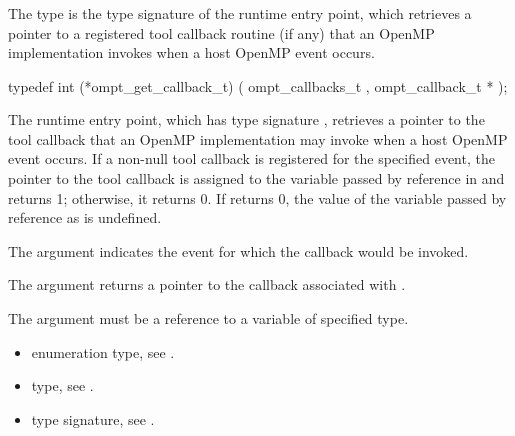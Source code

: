 \subsubsection{}
\label{sec:ompt_get_callback_t}
\label{sec:ompt_get_callback}

\summary
The  type is the type signature of the 
 runtime entry point, which retrieves a
pointer to a registered tool callback routine (if any) that an 
OpenMP implementation invokes when a host OpenMP event occurs.

\format
\begin{ccppspecific}
\begin{omptCallback}
typedef int (*ompt_get_callback_t) (
  ompt_callbacks_t ,
  ompt_callback_t *
);
\end{omptCallback}
\end{ccppspecific}

\descr
The  runtime entry point, which has type signature 
, retrieves a pointer to the tool callback that
an OpenMP implementation may invoke when a host OpenMP event occurs. If a 
non-null tool callback is registered for the specified event, the pointer 
to the tool callback is assigned to the variable passed by reference in
 and  returns 1; otherwise, it returns 0. 
If  returns 0, the value of the variable passed by 
reference as  is undefined.

\argdesc
The  argument indicates the event for which the callback would 
be invoked.

The  argument returns a pointer to the callback associated 
with .

\constraints
The  argument must be a reference to a variable of specified type.

\crossreferences
\begin{itemize}
\item {} enumeration type, see .

\item {} type, see .

\item {} type signature,
see .
\end{itemize}


